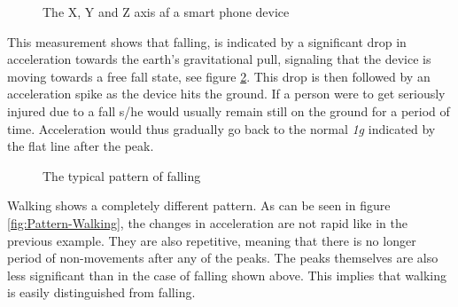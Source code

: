 \documentclass[12pt, a4paper, onecolumn]{article}
\begin{document}
	\begin{figure}[H]
		\centering
		\caption{The X, Y and Z axis af a smart phone device}%
		\label{fig:XYZ-Axis}%
	\end{figure}
	
	This measurement shows that falling, is indicated by a significant drop in acceleration towards the earth's gravitational pull, signaling that the device is moving towards a free fall state, see figure \ref{fig:Pattern-Falling}. This drop is then followed by an acceleration spike as the device hits the ground. If a person were to get seriously injured due to a fall s/he would usually remain still on the ground for a period of time. Acceleration would thus gradually go back to the normal \textit{1g} indicated by the flat line after the peak. 
	
	\begin{figure}[H]
		\centering
		\caption{The typical pattern of falling}%
		\label{fig:Pattern-Falling}%
	\end{figure}
	
	
	Walking shows a completely different pattern. As can be seen in figure \ref{fig:Pattern-Walking}, the changes in acceleration are not rapid like in the previous example. They are also repetitive, meaning that there is no longer period of non-movements after any of the peaks. The peaks themselves are also less significant than in the case of falling shown above. This implies that walking is easily distinguished from falling.
	
\end{document}

